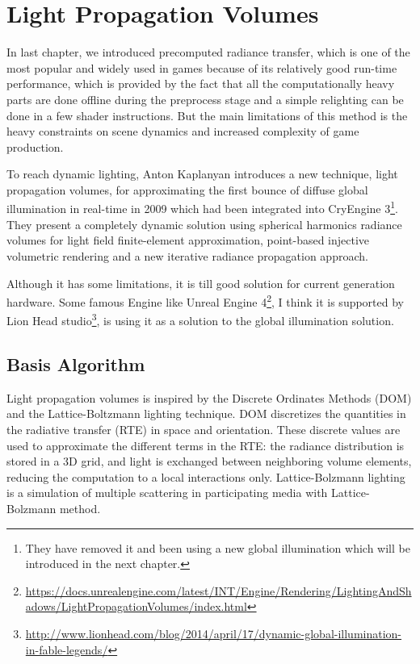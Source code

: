 \chapter{Light Propagation Volumes}\label{chp:lpv}
In last chapter, we introduced precomputed radiance transfer, which is one of the most popular and widely used in games because of its relatively good run-time performance, which is provided by the fact that all the computationally heavy parts are done offline during the preprocess stage and a simple relighting can be done in a few shader instructions. But the main limitations of this method is the heavy constraints on scene dynamics and increased complexity of game production.

To reach dynamic lighting, Anton Kaplanyan\cite[-7mm]{a:LightPropagationVolumesinCryEngine3} introduces a new technique, light propagation volumes, for approximating the first bounce of diffuse global illumination in real-time in 2009 which had been integrated into CryEngine 3\footnote{They have removed it and been using a new global illumination which will be introduced in the next chapter.}. They present a completely dynamic solution using spherical harmonics radiance volumes for light field finite-element approximation, point-based injective volumetric rendering and a new iterative radiance propagation approach.

Although it has some limitations, it is till good solution for current generation hardware. Some famous Engine like Unreal Engine 4\footnote{\url{https://docs.unrealengine.com/latest/INT/Engine/Rendering/LightingAndShadows/LightPropagationVolumes/index.html}}, I think it is supported by Lion Head studio\footnote{\url{http://www.lionhead.com/blog/2014/april/17/dynamic-global-illumination-in-fable-legends/}}, is using it as a solution to the global illumination solution.



\section{Basis Algorithm}
Light propagation volumes is inspired by the Discrete Ordinates Methods (DOM)\cite[-5mm]{a:RadiativeTransfer} and the Lattice-Boltzmann lighting\cite[5mm]{a:Lattice-BoltzmannLighting} technique. DOM discretizes the quantities in the radiative transfer (RTE) in space and orientation. These discrete values are used to approximate the different terms in the RTE: the radiance distribution is stored in a 3D grid, and light is exchanged between neighboring volume elements, reducing the computation to a local interactions only. Lattice-Bolzmann lighting is a simulation of multiple scattering in participating media with Lattice-Bolzmann method.

